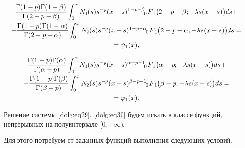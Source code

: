 \begin{multline}\label{dolg:eq29}

\frac{\Gamma(1-p)\Gamma(1-\beta)}{\Gamma(2-p-\beta)} \int _0^x N_1(s) s^{-p} (x-s)^{1-p-\beta}  \,\,

F_{\hspace{-4mm}0 \hspace{3mm}1} \bigl(2-p-\beta;-\lambda s (x-s)\bigr) ds +

\\

+\frac{\Gamma(1-p)\Gamma(1-\alpha)}{\Gamma(2-p-\alpha)} \int _0^x N_2(s) s^{-p} (x-s)^{1-p-\alpha}  \,\,

F_{\hspace{-4mm}0 \hspace{3mm}1} \bigl(2-p-\alpha;-\lambda s (x-s)\bigr) ds =

\\ = \psi_1(x),

\end{multline}

\begin{multline}\label{dolg:eq30}

\frac{\Gamma(1-p)\Gamma(\alpha)}{\Gamma(\alpha-p)} \int _0^x N_1(s) s^{-p} (x-s)^{\alpha-p-1}  \,\,

F_{\hspace{-4mm}0 \hspace{3mm}1} \bigl(\alpha-p;-\lambda s (x-s)\bigr) ds +

\\

+\frac{\Gamma(1-p)\Gamma(\beta)}{\Gamma(\beta-p)} \int _0^x N_2(s) s^{-p} (x-s)^{\beta-p-1}  \,\,

F_{\hspace{-4mm}0 \hspace{3mm}1} \bigl(\beta-p;-\lambda s (x-s)\bigr) ds = \\ = \varphi_1(x).

\end{multline}



Решение системы \eqref{dolg:eq29}, \eqref{dolg:eq30} будем искать в классе функций, непрерывных на полуинтервале $[0,+\infty)$. 

Для этого потребуем от заданных функций выполнения следующих условий.



\smallskip



\hypertarget{d:uslA}{}



